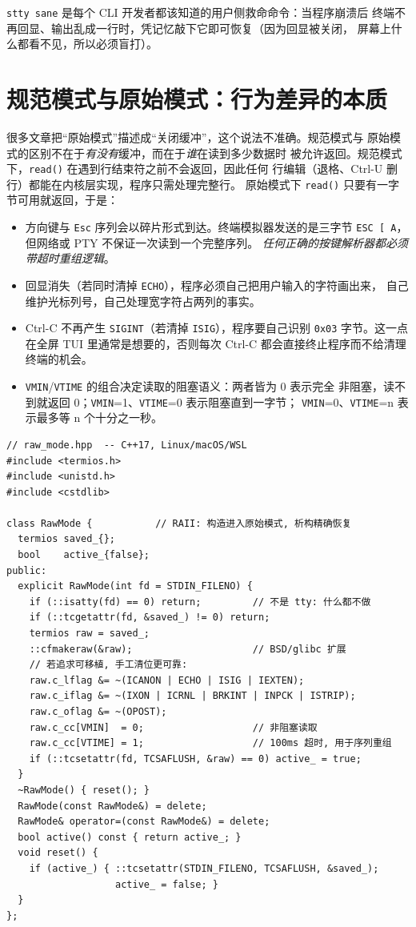\documentclass[12pt,a4paper,fontset=fandol]{ctexbook}
\newcommand{\Fn}[1]{\texttt{#1()}}
\newcommand{\Tp}[1]{\texttt{#1}}
\newcommand{\Bk}{\allowbreak}
\begin{document}
\Tp{stty sane} 是每个 CLI 开发者都该知道的用户侧救命命令：当程序崩溃后
终端不再回显、输出乱成一行时，凭记忆敲下它即可恢复（因为回显被关闭，
屏幕上什么都看不见，所以必须盲打）。

\section{规范模式与原始模式：行为差异的本质}

很多文章把``原始模式''描述成``关闭缓冲''，这个说法不准确。规范模式与
原始模式的区别不在于\emph{有没有}缓冲，而在于\emph{谁}在读到多少数据时
被允许返回。规范模式下，\Fn{read} 在遇到行结束符之前不会返回，因此任何
行编辑（退格、Ctrl-U 删行）都能在内核层实现，程序只需处理完整行。
原始模式下 \Fn{read} 只要有一字节可用就返回，于是：

\begin{itemize}
\item 方向键与 \Tp{Esc} 序列会以碎片形式到达。终端模拟器发送的是三字节
      \Tp{ESC [ A}，但网络或 PTY 不保证一次读到一个完整序列。
      \emph{任何正确的按键解析器都必须带超时重组逻辑}。
\item 回显消失（若同时清掉 \Tp{ECHO}），程序必须自己把用户输入的字符画出来，
      自己维护光标列号，自己处理宽字符占两列的事实。
\item Ctrl-C 不再产生 \Tp{SIGINT}（若清掉 \Tp{ISIG}），程序要自己识别
      \Tp{0x03} 字节。这一点在全屏 TUI 里通常是想要的，否则每次 Ctrl-C
      都会直接终止程序而不给清理终端的机会。
\item \Tp{VMIN}/{\Bk}\Tp{VTIME} 的组合决定读取的阻塞语义：两者皆为 0 表示完全
      非阻塞，读不到就返回 0；\Tp{VMIN}=1、\Tp{VTIME}=0 表示阻塞直到一字节；
      \Tp{VMIN}=0、\Tp{VTIME}=n 表示最多等 n 个十分之一秒。
\end{itemize}

\begin{lstlisting}[caption={POSIX 原始模式的最小正确实现（保存与恢复）}]
// raw_mode.hpp  -- C++17, Linux/macOS/WSL
#include <termios.h>
#include <unistd.h>
#include <cstdlib>

class RawMode {           // RAII: 构造进入原始模式, 析构精确恢复
  termios saved_{};
  bool    active_{false};
public:
  explicit RawMode(int fd = STDIN_FILENO) {
    if (::isatty(fd) == 0) return;         // 不是 tty: 什么都不做
    if (::tcgetattr(fd, &saved_) != 0) return;
    termios raw = saved_;
    ::cfmakeraw(&raw);                     // BSD/glibc 扩展
    // 若追求可移植, 手工清位更可靠:
    raw.c_lflag &= ~(ICANON | ECHO | ISIG | IEXTEN);
    raw.c_iflag &= ~(IXON | ICRNL | BRKINT | INPCK | ISTRIP);
    raw.c_oflag &= ~(OPOST);
    raw.c_cc[VMIN]  = 0;                   // 非阻塞读取
    raw.c_cc[VTIME] = 1;                   // 100ms 超时, 用于序列重组
    if (::tcsetattr(fd, TCSAFLUSH, &raw) == 0) active_ = true;
  }
  ~RawMode() { reset(); }
  RawMode(const RawMode&) = delete;
  RawMode& operator=(const RawMode&) = delete;
  bool active() const { return active_; }
  void reset() {
    if (active_) { ::tcsetattr(STDIN_FILENO, TCSAFLUSH, &saved_);
                   active_ = false; }
  }
};
\end{lstlisting}
\end{document}

